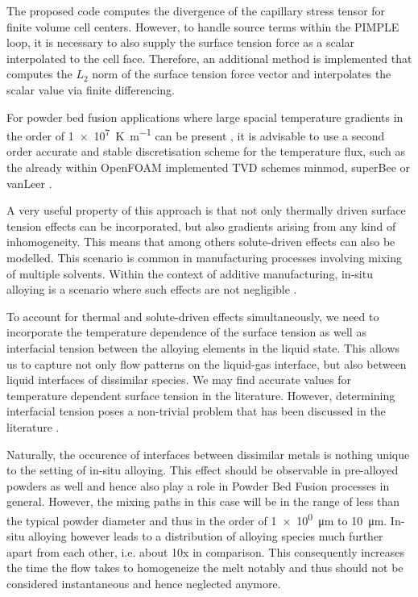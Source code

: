 \documentclass[conference,final]{IEEEtran}
\begin{document}
The proposed code computes the divergence of the capillary stress tensor for finite volume cell centers. However, to handle source terms within the PIMPLE loop, it is necessary to also supply the surface tension force as a scalar interpolated to the cell face. Therefore, an additional method is implemented that computes the $L_2$ norm of the surface tension force vector and interpolates the scalar value via finite differencing.

For powder bed fusion applications where large spacial temperature gradients in the order of \SI[per-mode=fraction]{1e7}{\kelvin \per \metre} can be present \cite{hooperMeltPoolTemperature2018}, it is advisable to use a second order accurate and stable discretisation scheme for the temperature flux, such as the already within OpenFOAM implemented TVD schemes minmod, superBee or vanLeer \cite{roeCharacteristicBasedSchemesEuler1986,vanleerUltimateConservativeDifference1974}.

A very useful property of this approach is that not only thermally driven surface tension effects can be incorporated, but also gradients arising from any kind of inhomogeneity. This means that among others solute-driven effects can also be modelled. This scenario is common in manufacturing processes involving mixing of multiple solvents. Within the context of additive manufacturing, in-situ alloying is a scenario where such effects are not negligible \cite{katz-demyanetzInsituAlloyingNovel2020}.

To account for thermal and solute-driven effects simultaneously, we need to incorporate the temperature dependence of the surface tension as well as interfacial tension between the alloying elements in the liquid state. This allows us to capture not only flow patterns on the liquid-gas interface, but also between liquid interfaces of dissimilar species. We may find accurate values for temperature dependent surface tension in the literature. However, determining interfacial tension poses a non-trivial problem that has been discussed in the literature \cite{marmurCorrelatingInterfacialTensions2010}.

Naturally, the occurence of interfaces between dissimilar metals is nothing unique to the setting of in-situ alloying. This effect should be observable in pre-alloyed powders as well and hence also play a role in Powder Bed Fusion processes in general. However, the mixing paths in this case will be in the range of less than the typical powder diameter and thus in the order of \SI[per-mode=fraction]{1e0}{\micro\metre} to \SI[per-mode=fraction]{10}{\micro\metre}. In-situ alloying however leads to a distribution of alloying species much further apart from each other, i.e. about 10x in comparison. This consequently increases the time the flow takes to homogeneize the melt notably and thus should not be considered instantaneous and hence neglected anymore.
\end{document}
